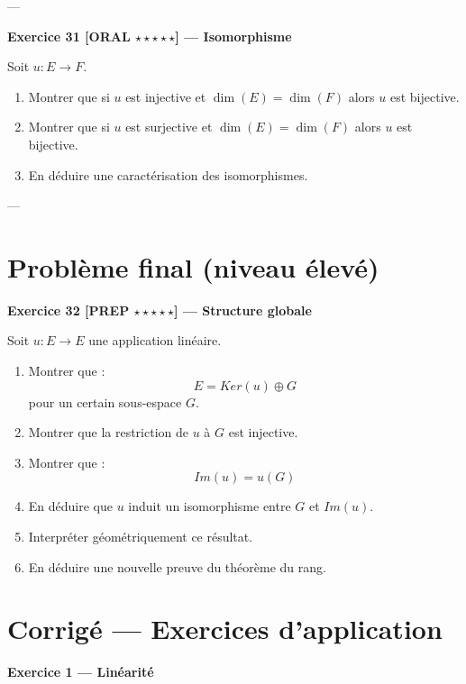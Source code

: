 \documentclass[11pt,a4paper]{article}
\begin{document}
---

\textbf{Exercice 31 [ORAL $\star\star\star\star\star$] — Isomorphisme}

Soit $u : E \to F$.

\begin{enumerate}
\item Montrer que si $u$ est injective et $\dim(E)=\dim(F)$ alors $u$ est bijective.
\item Montrer que si $u$ est surjective et $\dim(E)=\dim(F)$ alors $u$ est bijective.
\item En déduire une caractérisation des isomorphismes.
\end{enumerate}

---

\section{Problème final (niveau élevé)}

\textbf{Exercice 32 [PREP $\star\star\star\star\star$] — Structure globale}

Soit $u : E \to E$ une application linéaire.

\begin{enumerate}
\item Montrer que :
\[
E = Ker(u) \oplus G
\]
pour un certain sous-espace $G$.

\item Montrer que la restriction de $u$ à $G$ est injective.

\item Montrer que :
\[
Im(u) = u(G)
\]

\item En déduire que $u$ induit un isomorphisme entre $G$ et $Im(u)$.

\item Interpréter géométriquement ce résultat.

\item En déduire une nouvelle preuve du théorème du rang.
\end{enumerate}
\section{Corrigé — Exercices d'application}

\textbf{Exercice 1 — Linéarité}
\end{document}
